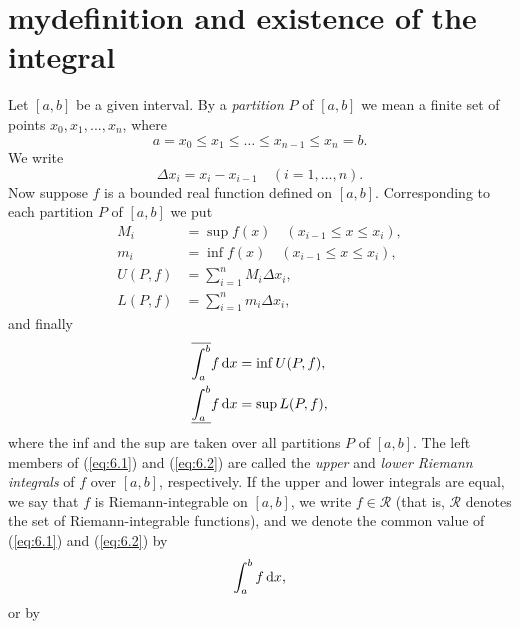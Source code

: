 \section{mydefinition and existence of the integral}
\begin{mydef}
    \label{mydef:6.1}
    Let $[a, b]$ be a given interval. 
    By a \emph{partition} $P$ of $[a, b]$ 
    we mean a finite set of points $x_0, x_1, ... , x_n$, where
    \begin{equation*}
        a = x_0 \leq x_1 \leq \dots \leq x_{n-1} \leq x_n = b.
    \end{equation*}
    We write
    \begin{equation*}
        \Delta x_i = x_i - x_{i-1}
        \quad    (i=1, ... ,n).
    \end{equation*}
    Now suppose $f$ is a bounded real function defined on $[a, b ]$. 
    Corresponding to each partition $P$ of $[a, b]$ we put
    \begin{align*}
        M_i &= \sup f(x) \quad (x_{i-1} \leq x \leq x_i), \\
        m_i &= \inf f(x) \quad (x_{i-1} \leq x \leq x_i), \\
        U(P,f) &= \sum_{i=1}^{n} M_i \Delta x_i,\\
        L(P,f) &= \sum_{i=1}^{n} m_i \Delta x_i,
    \end{align*}
    and finally
    \begin{align}
        \label{eq:6.1}
        \overline{\int_{a}^{b}} f \d x &= \inf U(P, f), \\
        \label{eq:6.2}
        \underline{\int_{a}^{b}} f \d x &= \sup L(P, f),
    \end{align}
    where the inf and the sup are taken over all partitions $P$ of $[a, b]$. 
    The left members of (\ref{eq:6.1}) and (\ref{eq:6.2}) are called 
    the \emph{upper} and \emph{lower Riemann integrals} of $f$
    over $[a, b]$, respectively.
    If the upper and lower integrals are equal, 
    we say that $f$ is Riemann-integrable on $[a, b]$, 
    we write $f \in \mathscr{R}$ 
    (that is, $\mathscr{R}$ denotes the set of Riemann-integrable functions), 
    and we denote the common value of (\ref{eq:6.1}) and (\ref{eq:6.2}) by
    \begin{equation}
        \label{eq:6.3}
        \int_{a}^{b} f \d x,
    \end{equation}
    or by 
    \begin{equation}

\end{equation}
\end{mydef}
